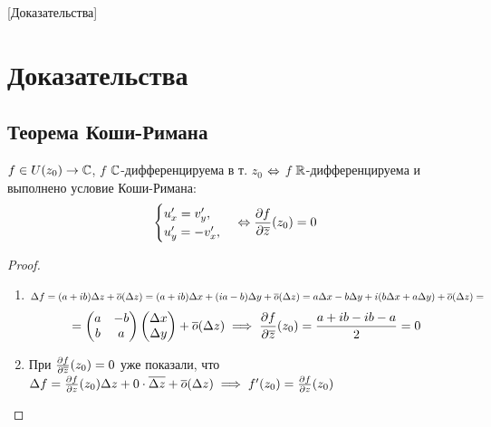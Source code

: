[Доказательства]
\newpage
\section{Доказательства}
\subsection{Теорема Коши-Римана}
\begin{theorem}
  $f\in U(z_0)\to\mathbb{C}$, $f$ $\mathbb{C}$-дифференцируема в т. $z_0$ $\Leftrightarrow$ $f$ $\mathbb{R}$-дифференцируема и выполнено условие Коши-Римана:
  \[ 
  \begin{cases}
    u'_x = v'_y, \\
    u'_y=-v'_x, 
  \end{cases}\Leftrightarrow \frac{\partial f}{\partial \overline{z}}(z_0)=0\]
\end{theorem}
\begin{proof}
 \begin{enumerate}
   \item[($\Rightarrow$):] $\Delta f = (a+ib)\Delta z + \overline{o}(\Delta z) = (a+ib)\Delta x + (ia-b)\Delta y + \overline{o}(\Delta z) = a\Delta x - b\Delta y + i(b\Delta x+ a\Delta y) +\overline{o}(\Delta z)=$
   \[=\begin{pmatrix}a&-b\\b&a\end{pmatrix}\begin{pmatrix}\Delta x\\\Delta y\end{pmatrix}+\overline{o}(\Delta z)\implies \frac{\partial f}{\partial \overline{z}}(z_0) = \frac{a + ib -ib -a}{2} = 0\]
     \item[($\Leftarrow$):] При $\frac{\partial f}{\partial \overline{z}}(z_0)=0$ уже показали, что $\Delta f = \frac{\partial f}{\partial z}(z_0)\Delta z + 0 \cdot \overline{\Delta z} + \overline{o}(\Delta z)\implies f'(z_0) = \frac{\partial f}{\partial z}(z_0)$
 \end{enumerate} 
\end{proof}
